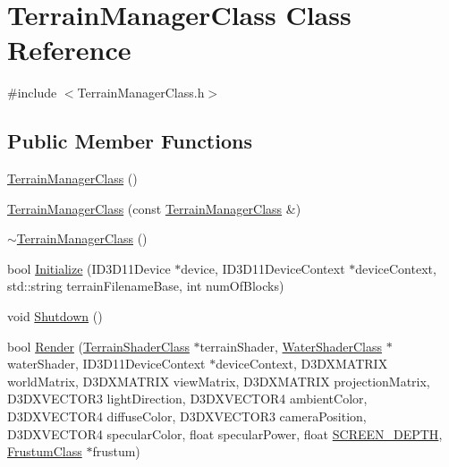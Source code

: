\hypertarget{class_terrain_manager_class}{}\section{Terrain\+Manager\+Class Class Reference}
\label{class_terrain_manager_class}


{\ttfamily \#include $<$Terrain\+Manager\+Class.\+h$>$}

\subsection*{Public Member Functions}
\begin{DoxyCompactItemize}
\item 
\hyperlink{class_terrain_manager_class_a0bfd7d768187733c4f91caa9244b5d4a}{Terrain\+Manager\+Class} ()
\item 
\hyperlink{class_terrain_manager_class_a562c48bbfba28b4e4143460a97ee7bf6}{Terrain\+Manager\+Class} (const \hyperlink{class_terrain_manager_class}{Terrain\+Manager\+Class} \&)
\item 
\hyperlink{class_terrain_manager_class_a7bfae7726a9430a1f85c07fa0172a360}{$\sim$\+Terrain\+Manager\+Class} ()
\item 
bool \hyperlink{class_terrain_manager_class_a99bad53700f5665b05cf7fa09765c6c6}{Initialize} (I\+D3\+D11\+Device $\ast$device, I\+D3\+D11\+Device\+Context $\ast$device\+Context, std\+::string terrain\+Filename\+Base, int num\+Of\+Blocks)
\item 
void \hyperlink{class_terrain_manager_class_a86c703e8fa08914ed006578e4bb7a205}{Shutdown} ()
\item 
bool \hyperlink{class_terrain_manager_class_acad3658d8883cc3da2515de3ea03e1fe}{Render} (\hyperlink{class_terrain_shader_class}{Terrain\+Shader\+Class} $\ast$terrain\+Shader, \hyperlink{class_water_shader_class}{Water\+Shader\+Class} $\ast$water\+Shader, I\+D3\+D11\+Device\+Context $\ast$device\+Context, D3\+D\+X\+M\+A\+T\+R\+IX world\+Matrix, D3\+D\+X\+M\+A\+T\+R\+IX view\+Matrix, D3\+D\+X\+M\+A\+T\+R\+IX projection\+Matrix, D3\+D\+X\+V\+E\+C\+T\+O\+R3 light\+Direction, D3\+D\+X\+V\+E\+C\+T\+O\+R4 ambient\+Color, D3\+D\+X\+V\+E\+C\+T\+O\+R4 diffuse\+Color, D3\+D\+X\+V\+E\+C\+T\+O\+R3 camera\+Position, D3\+D\+X\+V\+E\+C\+T\+O\+R4 specular\+Color, float specular\+Power, float \hyperlink{_graphics_class_8h_ae4d41ac39678c64d2ef730cecc77cc64}{S\+C\+R\+E\+E\+N\+\_\+\+D\+E\+P\+TH}, \hyperlink{class_frustum_class}{Frustum\+Class} $\ast$frustum)
\item 

\end{DoxyCompactItemize}
